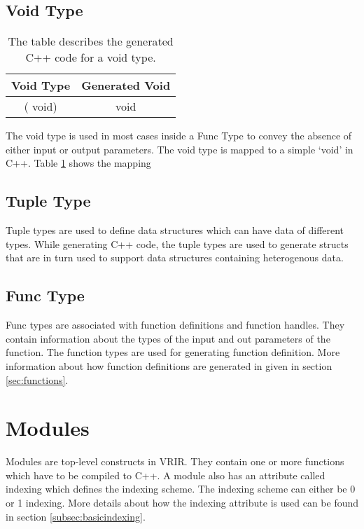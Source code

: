 \subsection{Void Type}
\begin{table}[htbp]
\centering
\begin{tabular}{|c|c|}
\hline
Void Type & Generated Void \\ \hline
( void)   & void           \\ \hline
\end{tabular}
\caption[voidTypeMapping]{The table describes the generated C++ code for a void type.}
\label{tab:voidTypeMap}
\end{table}
The void type is used in most cases inside a Func Type to convey the absence of either input or output parameters. The void type is mapped to a simple `void' in C++. Table \ref{tab:voidTypeMap} shows the mapping
\subsection{Tuple Type}
Tuple types are used to define data structures which can have data of different types. While generating C++ code, the tuple types are used to generate structs that are in turn used to support data structures containing heterogenous data.
\subsection{Func Type}
Func types are associated with function definitions and function handles. They contain information about the types of the input and out parameters of the function. The function types are used for generating function definition. More information about how function definitions are generated in given in section \ref{sec:functions}.
\section{Modules}
Modules are top-level constructs in VRIR. They contain one or more functions which have to be compiled to C++. A module also has an attribute called indexing which defines the indexing scheme. The indexing scheme can either be 0 or 1 indexing. More details about how the indexing attribute is used can be found in section \ref{subsec:basicindexing}.
